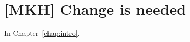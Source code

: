 \section{[MKH] Change is needed}
\label{sec:change_needed}

In Chapter~\ref{chap:intro}.














%
%


